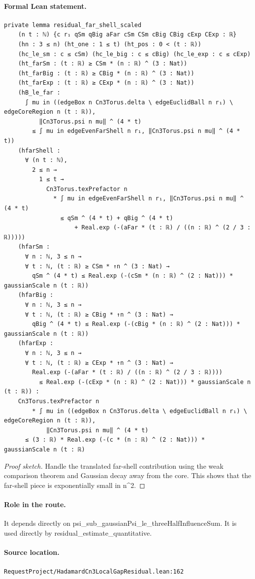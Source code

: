 \medskip
\paragraph{Formal Lean statement.}
\begin{verbatim}
private lemma residual_far_shell_scaled
    (n t : ℕ) {c r₁ qSm qBig aFar cSm CSm cBig CBig cExp CExp : ℝ}
    (hn : 3 ≤ n) (ht_one : 1 ≤ t) (ht_pos : 0 < (t : ℝ))
    (hc_le_sm : c ≤ cSm) (hc_le_big : c ≤ cBig) (hc_le_exp : c ≤ cExp)
    (ht_farSm : (t : ℝ) ≥ CSm * (n : ℝ) ^ (3 : Nat))
    (ht_farBig : (t : ℝ) ≥ CBig * (n : ℝ) ^ (3 : Nat))
    (ht_farExp : (t : ℝ) ≥ CExp * (n : ℝ) ^ (3 : Nat))
    (hB_le_far :
      ∫ mu in ((edgeBox n Cn3Torus.delta \ edgeEuclidBall n r₁) \ edgeCoreRegion n (t : ℝ)),
          ‖Cn3Torus.psi n mu‖ ^ (4 * t)
        ≤ ∫ mu in edgeEvenFarShell n r₁, ‖Cn3Torus.psi n mu‖ ^ (4 * t))
    (hfarShell :
      ∀ (n t : ℕ),
        2 ≤ n →
          1 ≤ t →
            Cn3Torus.texPrefactor n
              * ∫ mu in edgeEvenFarShell n r₁, ‖Cn3Torus.psi n mu‖ ^ (4 * t)
                ≤ qSm ^ (4 * t) + qBig ^ (4 * t)
                    + Real.exp (-(aFar * (t : ℝ) / ((n : ℝ) ^ (2 / 3 : ℝ)))))
    (hfarSm :
      ∀ n : ℕ, 3 ≤ n →
      ∀ t : ℕ, (t : ℝ) ≥ CSm * ↑n ^ (3 : Nat) →
        qSm ^ (4 * t) ≤ Real.exp (-(cSm * (n : ℝ) ^ (2 : Nat))) * gaussianScale n (t : ℝ))
    (hfarBig :
      ∀ n : ℕ, 3 ≤ n →
      ∀ t : ℕ, (t : ℝ) ≥ CBig * ↑n ^ (3 : Nat) →
        qBig ^ (4 * t) ≤ Real.exp (-(cBig * (n : ℝ) ^ (2 : Nat))) * gaussianScale n (t : ℝ))
    (hfarExp :
      ∀ n : ℕ, 3 ≤ n →
      ∀ t : ℕ, (t : ℝ) ≥ CExp * ↑n ^ (3 : Nat) →
        Real.exp (-(aFar * (t : ℝ) / ((n : ℝ) ^ (2 / 3 : ℝ))))
          ≤ Real.exp (-(cExp * (n : ℝ) ^ (2 : Nat))) * gaussianScale n (t : ℝ)) :
    Cn3Torus.texPrefactor n
        * ∫ mu in ((edgeBox n Cn3Torus.delta \ edgeEuclidBall n r₁) \ edgeCoreRegion n (t : ℝ)),
            ‖Cn3Torus.psi n mu‖ ^ (4 * t)
      ≤ (3 : ℝ) * Real.exp (-(c * (n : ℝ) ^ (2 : Nat))) * gaussianScale n (t : ℝ)
\end{verbatim}
\begin{proof}[Proof sketch]
Handle the translated far-shell contribution using the weak comparison theorem and Gaussian decay away from the core. This shows that the far-shell piece is exponentially small in n^2.
\end{proof}
\paragraph{Role in the route.}
It depends directly on psi\_sub\_gaussianPsi\_le\_threeHalfInfluenceSum. It is used directly by residual\_estimate\_quantitative.
\paragraph{Source location.}
\texttt{RequestProject/HadamardCn3LocalGapResidual.lean:162}
\medskip
